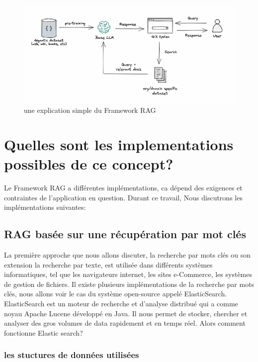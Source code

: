 \documentclass{article}
\begin{document}
\begin{figure}[h]
   \begin{center}
   \includegraphics[width=\textwidth]{rag-simple-explanation.png}
   \caption{une explication simple du Framework RAG}
   \end{center}
   \label{explicationsimplerag}
\end{figure}


\section{Quelles sont les implementations possibles de ce concept?}

Le Framework RAG a différentes implémentations, ca dépend des exigences et contraintes de l'application en question. 
Durant ce travail, Nous discutrons les implémentations suivantes:

\subsection{RAG basée sur une récupération par mot clés}

La première approche que nous allons discuter, la recherche par mots clés ou son extension la recherche par texte, est 
utilisée dans différents systèmes informatiques, tel que les navigateurs internet, les sites e-Commerce, les systèmes de gestion de fichiers. 
Il existe plusieurs implémentations de la recherche par mots clés, nous allons voir le cas du système open-source appelé ElasticSearch. 
ElasticSearch est un moteur de recherche et d'analyse distribué qui a comme noyau Apache Lucene développé en Java. 
Il nous permet de stocker, chercher et analyser des gros volumes de data rapidement et en temps réel. Alors comment fonctionne Elastic search? 

\subsubsection{les stuctures de données utilisées}
\end{document}
